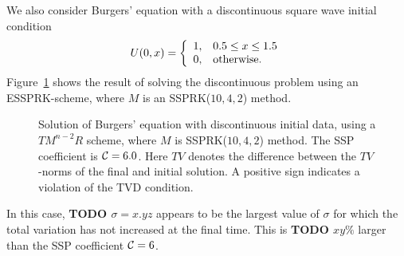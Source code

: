 We also consider Burgers' equation with a discontinuous
square wave initial condition
\begin{align*}%
    U(0,x)  = \left\{
                \begin{array}{ll}
                  1, & \hbox{$0.5 \leq x \leq 1.5$} \\
                  0, & \hbox{otherwise.}
                \end{array}
              \right.
\end{align*}
Figure~\ref{fig:burgers_discont} shows the result of solving the 
discontinuous problem using an ESSPRK-scheme, where $M$ is an 
SSPRK($10,4,2$) method.
\begin{figure}
    \centering
    \quad
    \caption{Solution of Burgers' equation with discontinuous initial data, using a 
    $TM^{n-2}R$ scheme, where $M$ is SSPRK($10,4,2$) method. 
    The SSP coefficient is $ \mathcal{C} = 6.0$.
    Here $TV$ denotes the difference between the $TV$-norms of the final and 
    initial solution.
    A positive sign indicates a violation of the TVD condition.}
    \label{fig:burgers_discont}
\end{figure}
In this case, \textbf{\red TODO $\sigma = x.yz$} appears to be the
largest value of $\sigma$ for which the total variation has not
increased at the final time.
This is \textbf{\red TODO $xy\%$} larger than the SSP coefficient
$\mathcal{C} = 6$.

